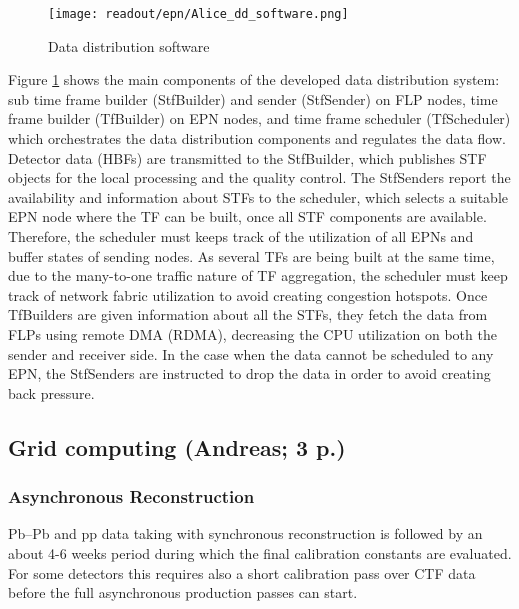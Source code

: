 \begin{figure}[ht]
\centering
\texttt{[image: readout/epn/Alice\_dd\_software.png]}
\caption{Data distribution software}
\label{fig:dd-software}
\end{figure}

Figure \ref{fig:dd-software} shows the main components of the developed data distribution system: sub time frame builder (StfBuilder) and sender (StfSender) on FLP nodes, time frame builder (TfBuilder) on EPN nodes, and time frame scheduler (TfScheduler) which orchestrates the data distribution components and regulates the data flow. 
Detector data (HBFs) are transmitted to the StfBuilder, which publishes STF objects for the local processing and the quality control. 
The StfSenders report the availability and information about STFs to the scheduler, which selects a suitable EPN node where the TF can be built, once all STF components are available. 
Therefore, the scheduler must keeps track of the utilization of all EPNs and buffer states of sending nodes. 
As several TFs are being built at the same time, due to the many-to-one traffic nature of TF aggregation, the scheduler must keep track of network fabric utilization to avoid creating congestion hotspots. 
Once TfBuilders are given information about all the STFs, they fetch the data from FLPs using remote DMA (RDMA), decreasing the CPU utilization on both the sender and receiver side. 
In the case when the data cannot be scheduled to any EPN, the StfSenders are instructed to drop the data in order to avoid creating back pressure.

\subsection{Grid computing (Andreas; 3 p.)}
\subsubsection{Asynchronous Reconstruction}
Pb--Pb and pp data taking with synchronous reconstruction is followed by an about 4-6 weeks period during which the final calibration constants are evaluated. For some detectors this requires also a short calibration pass over CTF data before the full asynchronous production passes can start.

